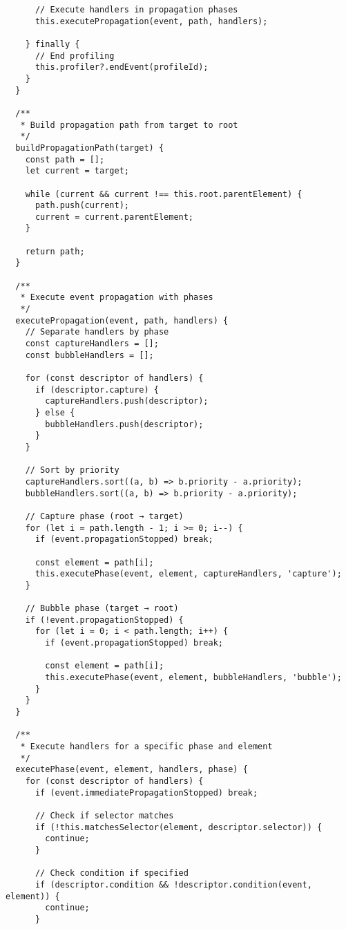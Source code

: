 \documentclass[11pt]{article}
\begin{document}
\begin{verbatim}
      // Execute handlers in propagation phases
      this.executePropagation(event, path, handlers);
      
    } finally {
      // End profiling
      this.profiler?.endEvent(profileId);
    }
  }
  
  /**
   * Build propagation path from target to root
   */
  buildPropagationPath(target) {
    const path = [];
    let current = target;
    
    while (current && current !== this.root.parentElement) {
      path.push(current);
      current = current.parentElement;
    }
    
    return path;
  }
  
  /**
   * Execute event propagation with phases
   */
  executePropagation(event, path, handlers) {
    // Separate handlers by phase
    const captureHandlers = [];
    const bubbleHandlers = [];
    
    for (const descriptor of handlers) {
      if (descriptor.capture) {
        captureHandlers.push(descriptor);
      } else {
        bubbleHandlers.push(descriptor);
      }
    }
    
    // Sort by priority
    captureHandlers.sort((a, b) => b.priority - a.priority);
    bubbleHandlers.sort((a, b) => b.priority - a.priority);
    
    // Capture phase (root → target)
    for (let i = path.length - 1; i >= 0; i--) {
      if (event.propagationStopped) break;
      
      const element = path[i];
      this.executePhase(event, element, captureHandlers, 'capture');
    }
    
    // Bubble phase (target → root)
    if (!event.propagationStopped) {
      for (let i = 0; i < path.length; i++) {
        if (event.propagationStopped) break;
        
        const element = path[i];
        this.executePhase(event, element, bubbleHandlers, 'bubble');
      }
    }
  }
  
  /**
   * Execute handlers for a specific phase and element
   */
  executePhase(event, element, handlers, phase) {
    for (const descriptor of handlers) {
      if (event.immediatePropagationStopped) break;
      
      // Check if selector matches
      if (!this.matchesSelector(element, descriptor.selector)) {
        continue;
      }
      
      // Check condition if specified
      if (descriptor.condition && !descriptor.condition(event, element)) {
        continue;
      }
      

\end{verbatim}
\end{document}
